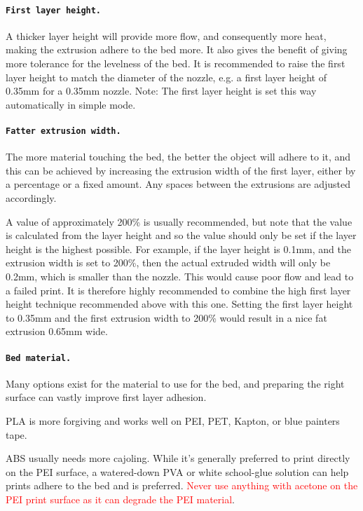\paragraph{\texttt{First layer height.}} %
\label{par:first_layer_height}
A thicker layer height will provide more flow, and consequently more heat, making the extrusion adhere to the bed more.  It also gives the benefit of giving more tolerance for the levelness of the bed.  It is recommended to raise the first layer height to match the diameter of the nozzle, e.g. a first layer height of 0.35mm for a 0.35mm nozzle.
Note: The first layer height is set this way automatically in simple mode.

\paragraph{\texttt{Fatter extrusion width.}} %
\label{par:wider_extrusion_width}
The more material touching the bed, the better the object will adhere to it, and this can be achieved by increasing the extrusion width of the first layer, either by a percentage or a fixed amount.  Any spaces between the extrusions are adjusted accordingly.

A value of approximately 200\% is usually recommended, but note that the value is calculated from the layer height and so the value should only be set if the layer height is the highest possible.  For example, if the layer height is 0.1mm, and the extrusion width is set to 200\%, then the actual extruded width will only be 0.2mm, which is smaller than the nozzle.   This would cause poor flow and lead to a failed print.  It is therefore highly recommended to combine the high first layer height technique recommended above with this one. Setting the first layer height to 0.35mm and the first extrusion width to 200\% would result in a nice fat extrusion 0.65mm wide.

\paragraph{\texttt{Bed material.}} %
\label{par:bed_material}
Many options exist for the material to use for the bed, and preparing the right surface can vastly improve first layer adhesion.

PLA is more forgiving and works well on PEI, PET, Kapton, or blue painters tape.

ABS usually needs more cajoling. While it's generally preferred to print directly on the PEI surface, a watered-down PVA or white school-glue solution can help prints adhere to the bed and is preferred. \textcolor{red}{Never use anything with acetone on the PEI print surface as it can degrade the PEI material}. 

